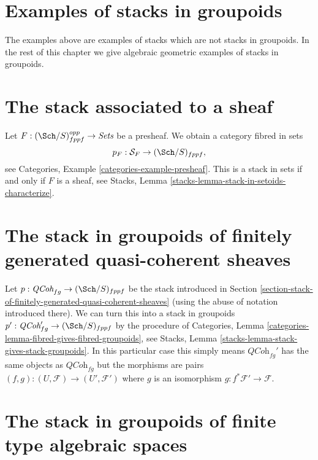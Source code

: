 \section{Examples of stacks in groupoids}
\label{section-examples-stacks-in-groupoids}

\noindent
The examples above are examples of stacks which are not stacks in
groupoids. In the rest of this chapter we give
algebraic geometric examples of stacks in groupoids.



\section{The stack associated to a sheaf}
\label{section-stack-associated-to-sheaf}

\noindent
Let $F : (\Sch/S)_{fppf}^{opp} \to \textit{Sets}$ be a presheaf.
We obtain a category fibred in sets
$$
p_F : \mathcal{S}_F \to (\Sch/S)_{fppf},
$$
see
Categories, Example \ref{categories-example-presheaf}.
This is a stack in sets if and only if $F$ is a sheaf, see
Stacks, Lemma \ref{stacks-lemma-stack-in-setoids-characterize}.



\section{The stack in groupoids of finitely generated quasi-coherent sheaves}
\label{section-stack-in-groupoids-of-quasi-coherent-sheaves}

\noindent
Let $p : \textit{QCoh}_{fg} \to (\Sch/S)_{fppf}$ be the stack
introduced in
Section \ref{section-stack-of-finitely-generated-quasi-coherent-sheaves}
(using the abuse of notation introduced there).
We can turn this into a stack in groupoids
$p' : \textit{QCoh}_{fg}' \to (\Sch/S)_{fppf}$ by
the procedure of
Categories, Lemma \ref{categories-lemma-fibred-gives-fibred-groupoids},
see
Stacks, Lemma \ref{stacks-lemma-stack-gives-stack-groupoids}.
In this particular case this simply means $\textit{QCoh}_{fg}'$ has
the same objects as $\textit{QCoh}_{fg}$ but the morphisms are
pairs $(f, g) : (U, \mathcal{F}) \to (U', \mathcal{F}')$
where $g$ is an isomorphism $g : f^*\mathcal{F}' \to \mathcal{F}$.


\section{The stack in groupoids of finite type algebraic spaces}
\label{section-stack-in-groupoids-of-finite-type-spaces}

